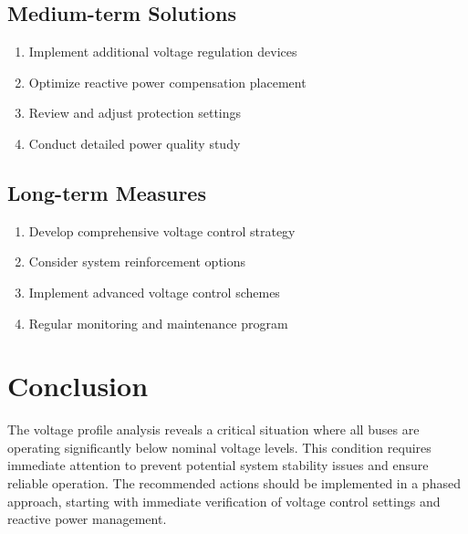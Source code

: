 \documentclass[11pt]{article}
\begin{document}
\subsection{Medium-term Solutions}
\begin{enumerate}
    \item Implement additional voltage regulation devices
    \item Optimize reactive power compensation placement
    \item Review and adjust protection settings
    \item Conduct detailed power quality study
\end{enumerate}

\subsection{Long-term Measures}
\begin{enumerate}
    \item Develop comprehensive voltage control strategy
    \item Consider system reinforcement options
    \item Implement advanced voltage control schemes
    \item Regular monitoring and maintenance program
\end{enumerate}

\section{Conclusion}
The voltage profile analysis reveals a critical situation where all buses are operating significantly below nominal voltage levels. This condition requires immediate attention to prevent potential system stability issues and ensure reliable operation. The recommended actions should be implemented in a phased approach, starting with immediate verification of voltage control settings and reactive power management.
\end{document}
